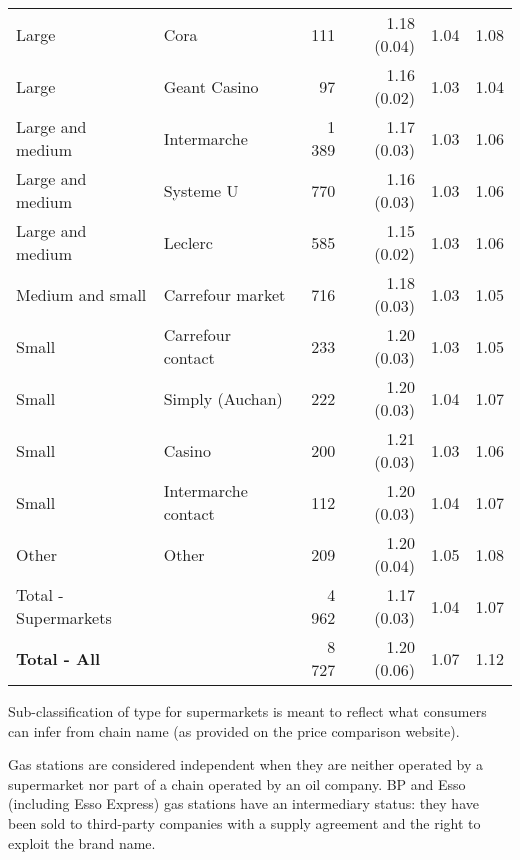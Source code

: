 \documentclass[english]{article}
\begin{document}
\begin{table}
\begin{threeparttable}
\begin{tabular}{lrrrrr}
    Large & \multicolumn{1}{l}{Cora} & 111   & 1.18 (0.04) & 1.04  & 1.08 \\
    Large & \multicolumn{1}{l}{Geant Casino} & 97    & 1.16 (0.02) & 1.03  & 1.04 \\
    Large and medium & \multicolumn{1}{l}{Intermarche} & 1 389 & 1.17 (0.03) & 1.03  & 1.06 \\
    Large and medium & \multicolumn{1}{l}{Systeme U} & 770   & 1.16 (0.03) & 1.03  & 1.06 \\
    Large and medium & \multicolumn{1}{l}{Leclerc} & 585   & 1.15 (0.02) & 1.03  & 1.06 \\
    Medium and small & \multicolumn{1}{l}{Carrefour market} & 716   & 1.18 (0.03) & 1.03  & 1.05 \\
    Small & \multicolumn{1}{l}{Carrefour contact} & 233   & 1.20 (0.03) & 1.03  & 1.05 \\
    Small & \multicolumn{1}{l}{Simply (Auchan)} & 222   & 1.20 (0.03) & 1.04  & 1.07 \\
    Small & \multicolumn{1}{l}{Casino} & 200   & 1.21 (0.03) & 1.03  & 1.06 \\
    Small & \multicolumn{1}{l}{Intermarche contact} & 112   & 1.20 (0.03) & 1.04  & 1.07 \\
    Other & \multicolumn{1}{l}{Other} & 209   & 1.20 (0.04) & 1.05  & 1.08 \\
    \midrule
    Total - Supermarkets &       & 4 962 & 1.17 (0.03) & 1.04  & 1.07 \\
    \midrule
    \textbf{Total - All} &       & 8 727 & 1.20 (0.06) & 1.07 & 1.12 \\
    \bottomrule

    \bottomrule
\end{tabular}
\begin{tablenotes}
			\small
			\item Sub-classification of type for supermarkets is meant to reflect what consumers can infer from chain name (as provided on the price comparison website).
      \item Gas stations are considered independent when they are neither operated by a supermarket nor part of a chain operated by an oil company. BP and Esso (including Esso Express) gas stations  have an intermediary status: they have been sold to third-party companies with a supply agreement and the right to exploit the brand name.
\end{tablenotes}
\end{threeparttable}
\end{table}
\end{document}
